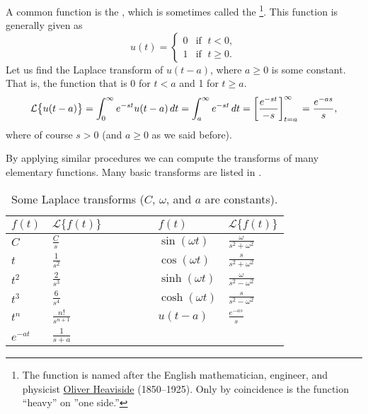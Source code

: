 \documentclass{ximera}
\begin{document}
\begin{example}
    A common function is the \emph{}, which is sometimes called the \emph{}%
    \footnote{
        The function is named after the English mathematician, engineer, and physicist \href{https://en.wikipedia.org/wiki/Heaviside}{Oliver Heaviside} (1850--1925).  Only by coincidence is the function ``heavy'' on ''one side.''
        }. 
    This function is generally given as
    \begin{equation*}
        u(t) = 
        \begin{cases}
            0 & \text{if } \; t < 0 , \\
            1 & \text{if } \; t \geq 0 .
        \end{cases}
    \end{equation*}
    Let us find the Laplace transform of $u(t-a)$, where $a \geq 0$ is some constant. That is, the function that is 0 for $t < a$ and 1 for $t \geq a$.
    \begin{equation*}
        \mathcal{L} \bigl\{ u(t-a) \bigr\} = \int_0^{\infty} e^{-st} u(t-a) \, dt = \int_a^{\infty} e^{-st} \, dt = \left[ \frac{e^{-st}}{-s} \right]_{t=a}^\infty \\
        = \frac{e^{-as}}{s} ,
    \end{equation*}
    where of course $s > 0$ (and $a \geq 0$ as we said before).
\end{example}

By applying similar procedures we can compute the transforms of many elementary functions.  Many basic transforms are listed in .

\begin{table}[h!t]
    \mybeginframe
    \capstart
    \begin{center}
        \begin{tabular}{@{}lllll@{}}
            \toprule
            $f(t)$ & $\mathcal{L} \bigl\{ f(t) \bigr\}$ & $\qquad\quad$ & $f(t)$ & $\mathcal{L} \bigl\{ f(t) \bigr\}$ \\
            \midrule
            $C$ & $\frac{C}{s}$ & & $\sin (\omega t)$ & $\frac{\omega}{s^2+\omega^2}$ \\[4pt]
            $t$ & $\frac{1}{s^2}$ & & $\cos (\omega t)$ & $\frac{s}{s^2+\omega^2}$ \\[4pt]
            $t^2$ & $\frac{2}{s^3}$ & & $\sinh (\omega t)$ & $\frac{\omega}{s^2-\omega^2}$ \\[4pt]
            $t^3$ & $\frac{6}{s^4}$ & & $\cosh (\omega t)$ & $\frac{s}{s^2-\omega^2}$ \\[4pt]
            $t^n$ & $\frac{n!}{s^{n+1}}$ & & $u(t-a)$ & $\frac{e^{-as}}{s}$ \\[4pt]
            $e^{-at}$ & $\frac{1}{s+a}$ & & & \\[4pt]
            \bottomrule
        \end{tabular}
    \end{center}
        \caption{Some Laplace transforms ($C$, $\omega$, and $a$ are constants).\label{lt:table}}
    \myendframe
\end{table}
\end{document}
